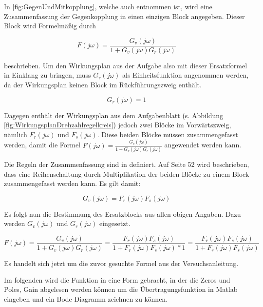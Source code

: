 \documentclass[            %
draft = false,             		%
paper = A4,                		%
pagesize = pdftex,         		%
fontsize = 10pt,           		%
DIV=15,                    		%
twoside = false,           		%
twocolumn = false,         		%
parskip = full,           		%
chapterprefix = false,      		%
appendixprefix = true,     		%
headinclude = false,       		%
footinclude = false,       		%
mpinclude = false,         		%
numbers = auto,            		%
cleardoublepage = plain,   		%
footnotes = multiple,      		%
titlepage = true,          		%
headings = normal,         		%
open = right,              		%
bibliography = openstyle,  		%
listof = chaptergapline,   		%
overfullrule = true,
]{scrbook}
\begin{document}
In \ref{fig:GegenUndMitkopplung}, welche auch \cite{Skript_Regelungstechnik} entnommen ist, wird eine Zusammenfassung der Gegenkopplung in einen einzigen
Block angegeben. Dieser Block wird Formelmäßig durch 

\begin{equation}
F(j\omega) = \frac{G_v(j\omega)}{1 + G_v(j\omega)G_r(j\omega)}
\end{equation}

beschrieben. Um den Wirkungsplan aus der Aufgabe also mit dieser Ersatzformel in Einklang zu bringen, muss $G_r(j\omega)$ als Einheitsfunktion angenommen werden, da
der Wirkungsplan keinen Block im Rückführungszweig enthält.

\begin{equation}
G_r(j\omega) = 1
\end{equation}

Dagegen enthält der Wirkungsplan aus dem Aufgabenblatt (s. Abbildung \ref{fig:WirkungsplanDrehzahlregelkreis}) jedoch zwei Blöcke im Vorwärtszweig, 
nämlich $F_r(j\omega)$ und $F_s(j\omega)$. Diese beiden Blöcke müssen zusammengefasst werden, damit die Formel $F(j\omega) = \frac{G_v(j\omega)}{1 + G_v(j\omega)G_r(j\omega)}$
angewendet werden kann.

Die Regeln der Zusammenfassung sind in \cite{Skript_Regelungstechnik} definiert. Auf Seite 52 wird beschrieben, dass eine Reihenschaltung durch Multiplikation der beiden Blöcke
zu einem Block zusammengefasst werden kann. Es gilt damit:

\begin{equation}
G_v(j\omega) = F_r(j\omega)F_s(j\omega)
\end{equation}

Es folgt nun die Bestimmung des Ersatzblocks aus allen obigen Angaben. Dazu werden $G_v(j\omega)$ und $G_r(j\omega)$ eingesetzt.	

\begin{equation}
F(j\omega) = \frac{G_v(j\omega)}{1 + G_v(j\omega)G_r(j\omega)} = \frac{F_r(j\omega)F_s(j\omega)}{1 + F_r(j\omega)F_s(j\omega) * 1} = \frac{F_r(j\omega)F_s(j\omega)}{1 + F_r(j\omega)F_s(j\omega)}
\end{equation}

Es handelt sich jetzt um die zuvor gesuchte Formel aus der Versuchsanleitung.

Im folgenden wird die Funktion in eine Form gebracht, in der die Zeros und Poles, Gain abgelesen werden können um die Übertragungsfunktion
in Matlab eingeben und ein Bode Diagramm zeichnen zu können.
\end{document}
